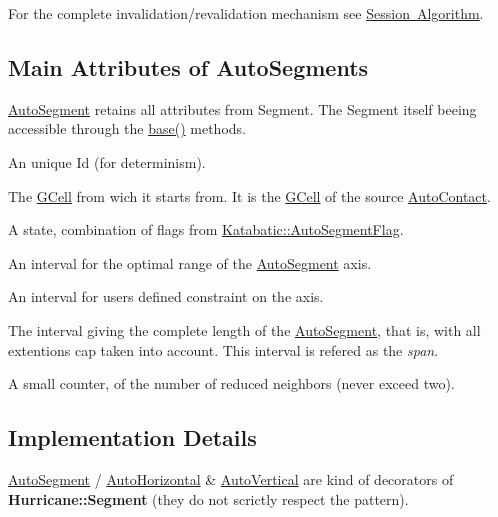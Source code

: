 For the complete invalidation/revalidation mechanism see \mbox{\hyperlink{classKatabatic_1_1Session_secSessionAlgo}{Session Algorithm}}.\hypertarget{classKatabatic_1_1AutoSegment_secASAttributes}{}\subsection{Main Attributes of Auto\+Segments}\label{classKatabatic_1_1AutoSegment_secASAttributes}
\mbox{\hyperlink{classKatabatic_1_1AutoSegment}{Auto\+Segment}} retains all attributes from Segment. The Segment itself beeing accessible through the \mbox{\hyperlink{classKatabatic_1_1AutoSegment_ade416d0483aefe986988fa89a7cf6fcf}{base()}} methods. 
\begin{DoxyItemize}
\item An unique {\ttfamily Id} (for determinism). 
\item The \mbox{\hyperlink{classKatabatic_1_1GCell}{G\+Cell}} from wich it starts from. It is the \mbox{\hyperlink{classKatabatic_1_1GCell}{G\+Cell}} of the source \mbox{\hyperlink{classKatabatic_1_1AutoContact}{Auto\+Contact}}. 
\item A state, combination of flags from \mbox{\hyperlink{namespaceKatabatic_a94585537ee1724ea9315578ec54380f4}{Katabatic\+::\+Auto\+Segment\+Flag}}. 
\item An interval for the optimal range of the \mbox{\hyperlink{classKatabatic_1_1AutoSegment}{Auto\+Segment}} axis. 
\item An interval for user\textquotesingle{}s defined constraint on the axis. 
\item The interval giving the complete length of the \mbox{\hyperlink{classKatabatic_1_1AutoSegment}{Auto\+Segment}}, that is, with all extentions cap taken into account. This interval is refered as the {\itshape span}. 
\item A small counter, of the number of reduced neighbors (never exceed two). 
\end{DoxyItemize}\hypertarget{classKatabatic_1_1AutoSegment_secASImplementation}{}\subsection{Implementation Details}\label{classKatabatic_1_1AutoSegment_secASImplementation}
\mbox{\hyperlink{classKatabatic_1_1AutoSegment}{Auto\+Segment}} / \mbox{\hyperlink{classKatabatic_1_1AutoHorizontal}{Auto\+Horizontal}} \& \mbox{\hyperlink{classKatabatic_1_1AutoVertical}{Auto\+Vertical}} are kind of decorators of \textbf{ Hurricane\+::\+Segment} (they do not scrictly respect the pattern).

